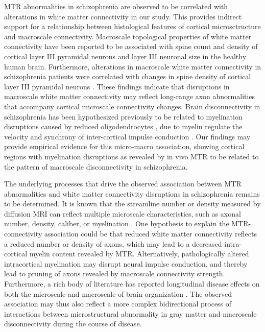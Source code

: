 \begin{refsection}
MTR abnormalities in schizophrenia are observed to be correlated with alterations in white matter connectivity in our study. This provides indirect support for a relationship between histological features of cortical microsctructure and macroscale connectivity. Macroscale topological properties of white matter connectivity have been reported to be associated with spine count and density of cortical layer III pyramidal neurons \citep{VANDENHEUVEL2016293} and layer III neuronal size \citep{Heuvel2015BridgingCA} in the healthy human brain. Furthermore, alterations in macroscale white matter connectivity in schizophrenia patients were correlated with changes in spine density of cortical layer III pyramidal neurons \citep{VANDENHEUVEL2016293}. These findings indicate that disruptions in macroscale white matter connectivity may reflect long-range axon abnormalities that accompany cortical microscale connectivity changes. Brain disconnectivity in schizophrenia has been hypothesized previously to be related to myelination disruptions caused by reduced oligodendrocytes \citep{Cassoli2015DisturbedMI}, due to myelin regulate the velocity and synchrony of inter-cortical impulse conduction \citep{Fields2008WhiteMI}. Our findings may provide empirical evidence for this micro-macro association, showing cortical regions with myelination disruptions as revealed by in vivo MTR to be related to the pattern of macroscale disconnectivity in schizophrenia. 

The underlying processes that drive the observed association between MTR abnormalities and white matter connectivity disruptions in schizophrenia remains to be determined. It is known that the streamline number or density measured by diffusion MRI can reflect multiple microscale characteristics, such as axonal number, density, caliber, or myelination \citep{Jones2013WhiteMI}. One hypothesis to explain the MTR-connectivity association could be that reduced white matter connectivity reflects a reduced number or density of axons, which may lead to a decreased intra-cortical myelin content revealed by MTR. Alternatively, pathologically altered intracortical myelination may disrupt neural impulse conduction, and thereby lead to pruning of axons revealed by macroscale connectivity strength. Furthermore, a rich body of literature has reported longitudinal disease effects on both the microscale and macroscale of brain organization \citep{Bullmore1997TheDN,Catani2005TheRA}. The observed association may thus also reflect a more complex bidirectional process of interactions between microstructural abnormality in gray matter and macroscale disconnectivity during the course of disease. 


\end{refsection}
